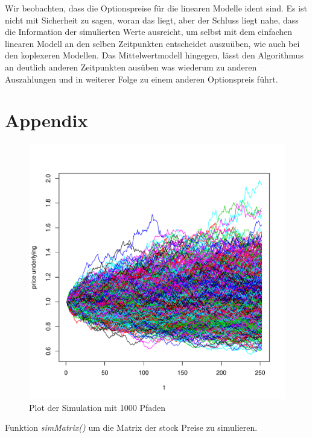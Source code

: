 \documentclass[10pt,a4paper]{report}\usepackage[]{graphicx}\usepackage[]{color}
\makeatletter
\def\maxwidth{ %
  \ifdim\Gin@nat@width>\linewidth
    \linewidth
  \else
    \Gin@nat@width
  \fi
}
\makeatother
\begin{document}
Wir beobachten, dass die Optionspreise für die linearen Modelle ident sind. Es ist nicht mit Sicherheit zu sagen, woran das liegt, aber der Schluss liegt nahe, dass die Information der simulierten Werte ausreicht, um selbst mit dem einfachen linearen Modell an den selben Zeitpunkten entscheidet auszuüben, wie auch bei den koplexeren Modellen. Das Mittelwertmodell hingegen, lässt den Algorithmus an deutlich anderen Zeitpunkten ausüben was wiederum zu anderen Auszahlungen und in weiterer Folge zu einem anderen Optionspreis führt.





\appendix

\chapter*{Appendix}

\begin{figure}[H]

\includegraphics[width=\maxwidth]{figure/unnamed-chunk-20-1} 

\caption{Plot der Simulation mit 1000 Pfaden}
\label{100P}
\end{figure}

Funktion \textit{simMatrix()} um die Matrix der stock Preise zu simulieren.
\end{document}
